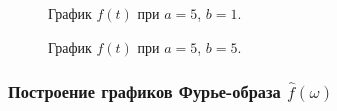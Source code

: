 \documentclass[a5paper, 10pt]{article}
\theoremstyle{definition}
\theoremstyle{plain}
\theoremstyle{remark}
\begin{document}
\begin{figure}[h!]
\caption{График $f(t)$ при $a = 5$, $b = 1$.}
\caption{График $f(t)$ при $a = 5$, $b = 5$.}
\end{figure}


\subsubsection{Построение графиков Фурье-образа $\hat{f} (\omega)$}
\end{document}

